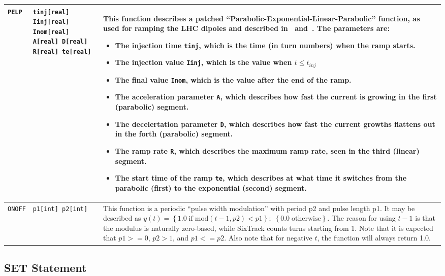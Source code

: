 \begin{center}
\begin{longtable}{|p{1.8cm} | p{4.1cm} | p{9.5cm}|}
    \texttt{PELP} & \texttt{tinj[real] Iinj[real] Inom[real] A[real] D[real] R[real] te[real]} &
    This function describes a patched ``Parabolic-Exponential-Linear-Parabolic'' function, as used for ramping the LHC dipoles and described in~\cite[Appendix C]{SRussen:fieldComp} and~\cite{BurlaKing:CurrentRamp}.
    The parameters are:
    \begin{itemize}
    \setlength\itemsep{-0.3em}
        \item The injection time \texttt{tinj}, which is the time (in turn numbers) when the ramp starts.
        \item The injection value \texttt{Iinj}, which is the value when $t\le t_{inj}$
        \item The final value \texttt{Inom}, which is the value after the end of the ramp.
        \item The acceleration parameter \texttt{A}, which describes how fast the current is growing in the first (parabolic) segment.
        \item The decelertation parameter \texttt{D}, which describes how fast the current growths flattens out in the forth (parabolic) segment.
        \item The ramp rate \texttt{R}, which describes the maximum ramp rate, seen in the third (linear) segment.
        \item The start time of the ramp \texttt{te}, which describes at what time it switches from the parabolic (first) to the exponential (second) segment.
    \end{itemize}
    \\*
    \hline

    \texttt{ONOFF} & \texttt{p1[int] p2[int]} &
    This function is a periodic ``pulse width modulation'' with period p2 and pulse length p1.
    It may be described as
    $y(t) =  \left\{1.0 \; \mathrm{if} \; \mathrm{mod}(t-1,p2) < p1 \right\}; \; \left\{ 0.0 \; \mathrm{otherwise} \right\}$.
    The reason for using $t-1$ is that the modulus is naturally zero-based, while SixTrack counts turns starting from 1.
    Note that it is expected that $p1 >= 0$, $p2 > 1$, and $p1 <= p2$.
    Also note that for negative $t$, the function will always return 1.0.
\end{longtable}
\normalsize
\end{center}

\subsection{SET Statement} \label{DYNK:SET}

